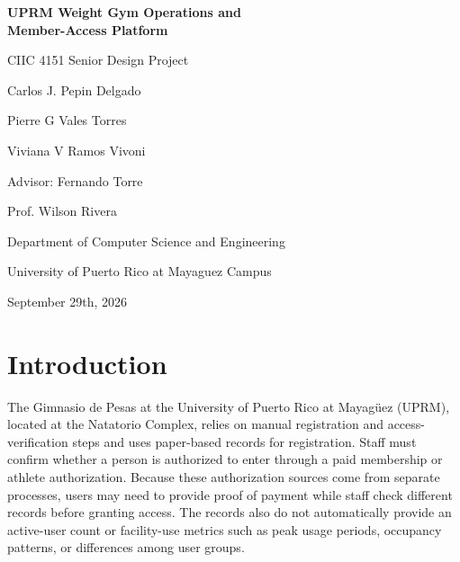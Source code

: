 \documentclass[11pt,letterpaper]{article}
\begin{document}
\begin{titlepage}
\thispagestyle{empty}
\centering
\vspace*{3.5cm}

{\LARGE\bfseries UPRM Weight Gym Operations and\\[0.3cm] Member-Access Platform\par}

\vspace{4cm}

{\large CIIC 4151 Senior Design Project\par}
\vspace{0.6cm}
{\large Carlos J. Pepin Delgado\par}
{\large Pierre G Vales Torres\par}
{\large Viviana V Ramos Vivoni\par}

\vspace{2cm}

{\large Advisor: Fernando Torre\par}
{\large Prof. Wilson Rivera\par}
\vspace{0.4cm}
{\large Department of Computer Science and Engineering\par}
{\large University of Puerto Rico at Mayaguez Campus\par}
\vspace{0.4cm}
{\large September 29th, 2026\par}

\vfill
\end{titlepage}


\section{Introduction}

The Gimnasio de Pesas at the University of Puerto Rico at Mayagüez (UPRM), located at the Natatorio Complex, relies on manual registration and access-verification steps and uses paper-based records for registration. Staff must confirm whether a person is authorized to enter through a paid membership or athlete authorization. Because these authorization sources come from separate processes, users may need to provide proof of payment while staff check different records before granting access. The records also do not automatically provide an active-user count or facility-use metrics such as peak usage periods, occupancy patterns, or differences among user groups.
\end{document}
